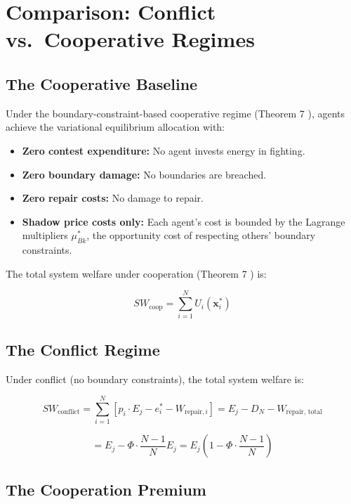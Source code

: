 \documentclass[11pt]{article}
\theoremstyle{plain}
\theoremstyle{definition}
\theoremstyle{remark}
\let\origsection\section
\renewcommand{\section}{\needspace{12\baselineskip}\origsection}
\let\origsubsection\subsection
\renewcommand{\subsection}{\needspace{7\baselineskip}\origsubsection}
\providecommand{\tightlist}{%
  \setlength{\itemsep}{0pt}\setlength{\parskip}{0pt}}
\begin{document}
\section{Comparison: Conflict vs.~Cooperative
Regimes}\label{comparison-conflict-vs.-cooperative-regimes}

\subsection{The Cooperative Baseline}\label{the-cooperative-baseline}

Under the boundary-constraint-based cooperative regime (Theorem 7
\citep{TC-I}), agents achieve the variational equilibrium allocation
with:

\begin{itemize}
\tightlist
\item
  \textbf{Zero contest expenditure:} No agent invests energy in
  fighting.
\item
  \textbf{Zero boundary damage:} No boundaries are breached.
\item
  \textbf{Zero repair costs:} No damage to repair.
\item
  \textbf{Shadow price costs only:} Each agent's cost is bounded by the
  Lagrange multipliers \(\mu_{Bk}^*\), the opportunity cost of
  respecting others' boundary constraints.
\end{itemize}

The total system welfare under cooperation (Theorem 7 \citep{TC-I}) is:

\[SW_{\text{coop}} = \sum_{i=1}^N U_i(\mathbf{x}_i^*)\]

\subsection{The Conflict Regime}\label{the-conflict-regime}

Under conflict (no boundary constraints), the total system welfare is:

\[SW_{\text{conflict}} = \sum_{i=1}^N \left[ p_i \cdot E_j - e_i^* - W_{\text{repair},i} \right] = E_j - D_N - W_{\text{repair, total}}\]

\[= E_j - \Phi \cdot \frac{N-1}{N} E_j = E_j \left(1 - \Phi \cdot \frac{N-1}{N}\right)\]

\subsection{The Cooperation Premium}\label{the-cooperation-premium}
\end{document}
